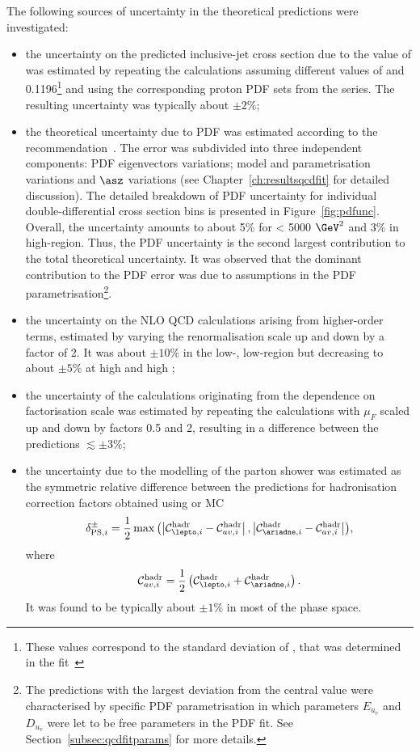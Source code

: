 The following sources of uncertainty in the theoretical predictions were investigated:
\begin{itemize}
 \item the uncertainty on the predicted inclusive-jet cross section due to the value of \asz was estimated by repeating the calculations assuming different values of  and 0.1196\footnote{These values correspond to the standard deviation of \as, that was determined in the \herapdf fit~\cite{upub:herapdf1.5}} and using the corresponding proton PDF sets from the  series. The resulting uncertainty was typically about $\pm2\%$;
 \item the theoretical uncertainty due to PDF was estimated according to the  recommendation~\cite{upub:herapdf1.5}. The error was subdivided into three independent components: PDF eigenvectors variations; model and parametrisation variations and $\asz$ variations (see Chapter~\ref{ch:resultsqcdfit} for detailed discussion). The detailed breakdown of PDF uncertainty for individual double-differential cross section bins is presented in Figure~\ref{fig:pdfunc}. Overall, the uncertainty amounts to about 5\% for \qsq < 5000 $\GeV^2$ and 3\% in high-\qsq region. Thus, the PDF uncertainty is the second largest contribution to the total theoretical uncertainty. It was observed that the dominant contribution to the PDF error was due to assumptions in the PDF parametrisation\footnote{The predictions with the largest deviation from the central value were characterised by specific PDF parametrisation in which parameters $E_{u_{v}}$ and $D_{u_{v}}$ were let to be free parameters in the PDF fit. See Section~\ref{subsec:qcdfitparams} for more details.}.
 \item the uncertainty on the NLO QCD calculations arising from higher-order terms, estimated by varying the renormalisation scale up and down by a factor of 2. It was about $\pm10\%$ in the low-\qsq, low-\etjetb region but decreasing to about $\pm5\%$ at high \qsq and high \etjetb;
 \item the uncertainty of the calculations originating from the dependence on factorisation scale was estimated by repeating the calculations with $\mu_F$ scaled up and down by factors 0.5 and 2, resulting in a difference between the predictions $\lesssim\pm 3\%$;
 \item the uncertainty due to the modelling of the parton shower was estimated as the symmetric relative difference between the predictions for hadronisation correction factors obtained using \lepto or \ariadne MC
\begin{equation}
\delta^{\pm}_{\text{PS},i} = \frac{1}{2}\max{\left(\left|\mathcal{C}^\text{hadr}_{\lepto,i} - \mathcal{C}^\text{hadr}_{av,i}\right|,\left|\mathcal{C}^\text{hadr}_{\ariadne,i} - \mathcal{C}^\text{hadr}_{av,i}\right|\right)},
\label{eq:hadrcorunc}
\end{equation}
where
\begin{equation}
\mathcal{C}^\text{hadr}_{av,i} = \frac{1}{2}\left(\mathcal{C}^\text{hadr}_{\lepto,i}+\mathcal{C}^\text{hadr}_{\ariadne,i}\right).\notag
\end{equation}
 It was found to be typically about $\pm 1\%$ in most of the phase space.
\end{itemize}
